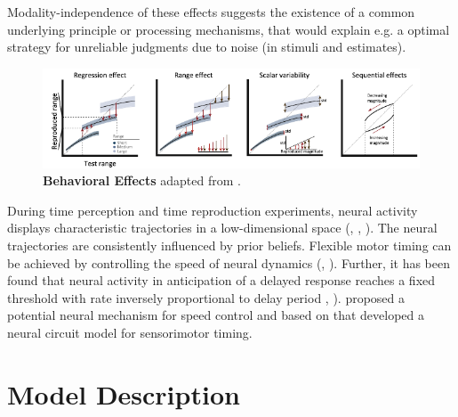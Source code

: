 \documentclass[9pt]{article}
\begin{document}
Modality-independence of these effects suggests the existence of a common underlying principle or processing mechanisms, that would explain e.g. a optimal strategy for unreliable judgments due to noise (in stimuli and estimates).

\begin{figure}[h]
	\centering
	\includegraphics{figures/behavioural_effects_petzschner.pdf}
	\caption{\textbf{Behavioral Effects} adapted from \cite{Petzschner2015}.}
\label{fig:behavioraleffects}
\end{figure}

During time perception and time reproduction experiments, neural activity displays characteristic trajectories in a low-dimensional space (\cite{Meirhaeghe2021}, \cite{Wang2018}, \cite{Henke2021}). 
The neural trajectories are consistently influenced by prior beliefs. 
Flexible motor timing can be achieved by controlling the speed of neural dynamics (\cite{Sohn2019}, \cite{Wang2018}). 
Further, it has been found that neural activity in anticipation of a delayed response reaches a fixed threshold with rate inversely proportional to delay period \cite{Murakami2014}, \cite{Mita2009}).
\cite{Wang2018} proposed a potential neural mechanism for speed control and based on that \cite{Egger2020} developed a neural circuit model for sensorimotor timing.

\section{Model Description}
\end{document}
